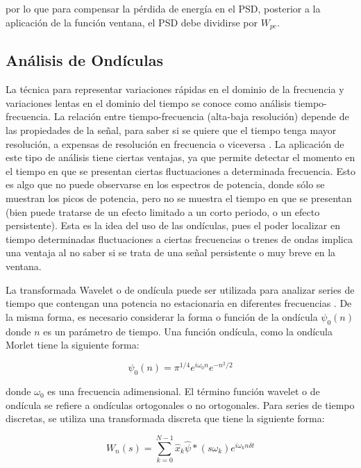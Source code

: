 por lo que para compensar la pérdida de energía en el PSD, posterior a la aplicación de la función ventana, el PSD debe dividirse por $W_{pc}$.
\vspace{1 em}

\subsection{Análisis de Ondículas}

La técnica para representar variaciones rápidas en el dominio de la frecuencia y variaciones lentas en el dominio del tiempo se conoce como análisis tiempo-frecuencia. La relación entre tiempo-frecuencia (alta-baja resolución) depende de las propiedades de la señal, para saber si se quiere que el tiempo tenga mayor resolución, a expensas de resolución en frecuencia o viceversa \parencite{book_analysis_Method_multiSp_data}. La aplicación de este tipo de análisis tiene ciertas ventajas, ya que permite detectar el momento en el tiempo en que se presentan ciertas fluctuaciones a determinada frecuencia. Esto es algo que no puede observarse en los espectros de potencia, donde sólo se muestran los picos de potencia, pero no se muestra el tiempo en que se presentan (bien puede tratarse de un efecto limitado a un corto periodo, o un efecto persistente). Esta es la idea del uso de las ondículas, pues el poder localizar en tiempo determinadas fluctuaciones a ciertas frecuencias o trenes de ondas implica una ventaja al no saber si se trata de una señal persistente o muy breve en la ventana. 
\vspace{1 em}

La transformada Wavelet o de ondícula puede ser utilizada para analizar series de tiempo que contengan una potencia no estacionaria en diferentes frecuencias \parencite{guide_wavelet_routines}. De la misma forma, es necesario considerar la forma o función de la ondícula $\psi_0(n)$ donde $n$ es un parámetro de tiempo. Una función ondícula, como la ondícula Morlet tiene la siguiente forma:

\begin{equation}
    \psi_0(n) = \pi^{1/4}e^{i \omega_0 n} e ^{-n^2/2}
\end{equation}

donde $\omega_0$ es una frecuencia adimensional. El término función wavelet o de ondícula se refiere a ondículas ortogonales o no ortogonales. Para series de tiempo discretas, se utiliza una transformada discreta que tiene la siguiente forma: 

\begin{equation}
    W_n(s) = \sum_{k = 0}^{N-1} \hat{x}_k \hat{\psi} \ast (s \omega_k) e^{i \omega_k n {\displaystyle \delta} t}
\end{equation}

